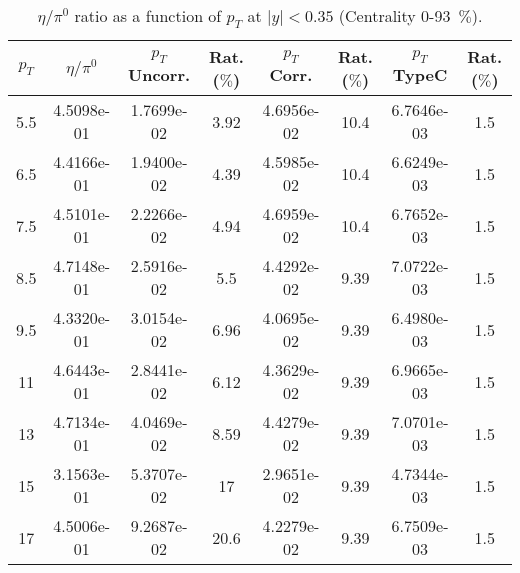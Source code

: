             
\begin{table}[!htb]
\centering
\begin{tabular}{|c|c|c|c|c|c|c|c|}
\hline
$p_{T}$ & $\eta/\pi^{0}$ & $p_{T}$ Uncorr. & Rat. ($\%$)  
& $p_{T}$ Corr. & Rat. ($\%$) & $p_{T}$ TypeC & Rat. ($\%$) \\
\hline
5.5 & 4.5098e-01 & 1.7699e-02 & 3.92 & 4.6956e-02 & 10.4 & 6.7646e-03 & 1.5 \\ 
6.5 & 4.4166e-01 & 1.9400e-02 & 4.39 & 4.5985e-02 & 10.4 & 6.6249e-03 & 1.5 \\ 
7.5 & 4.5101e-01 & 2.2266e-02 & 4.94 & 4.6959e-02 & 10.4 & 6.7652e-03 & 1.5 \\ 
8.5 & 4.7148e-01 & 2.5916e-02 & 5.5 & 4.4292e-02 & 9.39 & 7.0722e-03 & 1.5 \\ 
9.5 & 4.3320e-01 & 3.0154e-02 & 6.96 & 4.0695e-02 & 9.39 & 6.4980e-03 & 1.5 \\ 
11 & 4.6443e-01 & 2.8441e-02 & 6.12 & 4.3629e-02 & 9.39 & 6.9665e-03 & 1.5 \\ 
13 & 4.7134e-01 & 4.0469e-02 & 8.59 & 4.4279e-02 & 9.39 & 7.0701e-03 & 1.5 \\ 
15 & 3.1563e-01 & 5.3707e-02 & 17 & 2.9651e-02 & 9.39 & 4.7344e-03 & 1.5 \\ 
17 & 4.5006e-01 & 9.2687e-02 & 20.6 & 4.2279e-02 & 9.39 & 6.7509e-03 & 1.5 \\ 
\hline
\end{tabular}
\caption{$\eta/\pi^{0}$ ratio as a function of $p_{T}$ at $|y|<0.35$ (Centrality 0-93~$\%$).}
\end{table}
            
            
